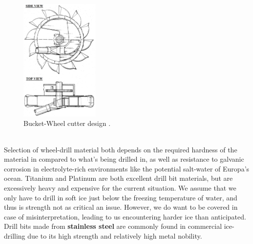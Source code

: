 \begin{figure}[htb]
	\centering
	\includegraphics[width=0.35\textwidth]{figures/Rasmus/WheelCutter}
	\caption{Bucket-Wheel cutter design \cite{Vonbucket}.
	\label{fig:WheelCut}}
\end{figure}
\\Selection of wheel-drill material both depends on the required hardness of the material in compared to what's being drilled in, as well as resistance to galvanic corrosion in electrolyte-rich environments like the potential salt-water of Europa's ocean. Titanium and Platinum are both excellent drill bit materials, but are excessively heavy and expensive for the current situation. We assume that we only have to drill in soft ice just below the freezing temperature of water, and thus is strength not as critical an issue. However, we do want to be covered in case of misinterpretation, leading to us encountering harder ice than anticipated. Drill bits made from \textbf{stainless steel} are commonly found in commercial ice-drilling due to its high strength and relatively high metal nobility\cite{Corrosion}.\\
\\

